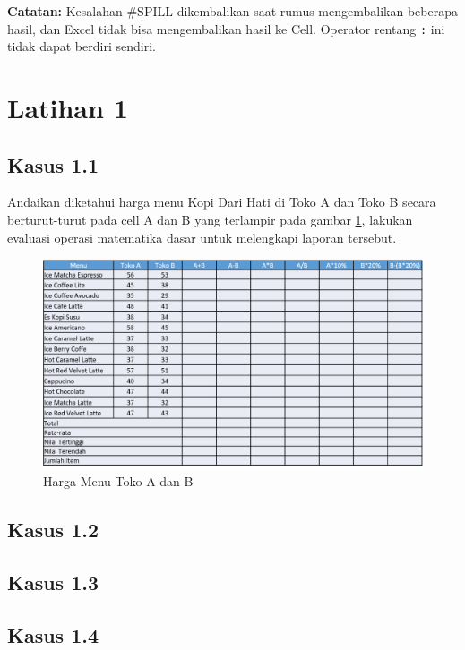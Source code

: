 \documentclass[
]{book}
\begin{document}
\textbf{Catatan:} Kesalahan \#SPILL dikembalikan saat rumus mengembalikan beberapa hasil, dan Excel tidak bisa mengembalikan hasil ke Cell. Operator rentang \texttt{:} ini tidak dapat berdiri sendiri.

\hypertarget{latihan-1}{%
\section{Latihan 1}\label{latihan-1}}

\hypertarget{kasus-1.1}{%
\subsection*{Kasus 1.1}\label{kasus-1.1}}

Andaikan diketahui harga menu Kopi Dari Hati di Toko A dan Toko B secara berturut-turut pada cell A dan B yang terlampir pada gambar \ref{fig:tabel1}, lakukan evaluasi operasi matematika dasar untuk melengkapi laporan tersebut.

\begin{figure}

{\centering \includegraphics[width=0.8\linewidth]{images/tabel1} 

}

\caption{Harga Menu Toko A dan B}\label{fig:tabel1}
\end{figure}

\hypertarget{kasus-1.2}{%
\subsection*{Kasus 1.2}\label{kasus-1.2}}

\hypertarget{kasus-1.3}{%
\subsection*{Kasus 1.3}\label{kasus-1.3}}

\hypertarget{kasus-1.4}{%
\subsection*{Kasus 1.4}\label{kasus-1.4}}

  
\end{document}
